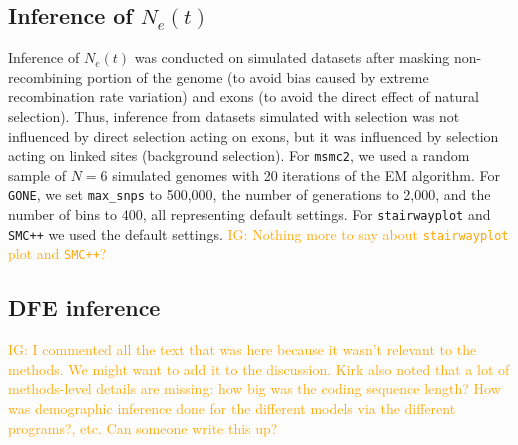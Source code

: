 \documentclass[hidelinks]{article}
\newcommand{\msmc}{\texttt{msmc2}\xspace}
\newcommand{\stairway}{\texttt{stairwayplot}\xspace}
\newcommand{\gone}{\texttt{GONE}\xspace}
\newcommand{\smcpp}{\texttt{SMC++}\xspace}
\newcommand{\igcomment}[1]{\textcolor{orange}{IG: #1}}
\begin{document}
    \subsection*{Inference of $N_e(t)$}
    Inference of $N_e(t)$ was conducted on simulated datasets after masking non-recombining portion
    of the genome (to avoid bias caused by extreme recombination rate variation)
    and exons (to avoid the direct effect of natural selection).
    Thus, inference from datasets simulated with selection was not influenced by direct selection
    acting on exons, but it was influenced by selection acting on linked sites (background selection).    
    For \msmc \citep{Schiffels2020}, we used a random sample of $N=6$ simulated genomes with 20
    iterations of the EM algorithm.
    For \gone \citep{santiago2020recent}, we set \texttt{max\_snps} to 500,000,
    the number of generations to 2,000, and the number of bins to 400, all representing default settings.
    For \stairway \citep{liu2020stairway} and \smcpp \citep{terhorst2017robust} we used the default settings.
    \igcomment{Nothing more to say about \stairway plot and \smcpp?}
    

    \subsection*{DFE inference}
    \igcomment{I commented all the text that was here because it wasn't relevant to the methods. We might want to add it to the discussion.
    Kirk also noted that a lot of methods-level details are missing:
    how big was the coding sequence length?
    How was demographic inference done for the different models via the different programs?,
    etc.
    Can someone write this up?}
    
\end{document}
